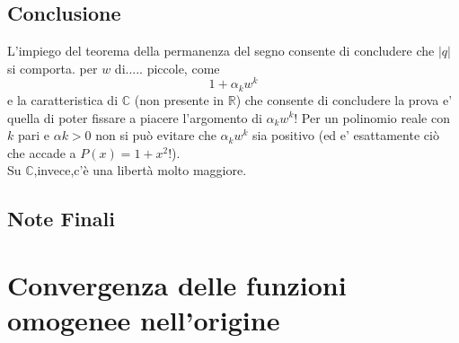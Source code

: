 \documentclass[fontsize = 20px, paper = a4]{article}
\begin{document}
\subsection{Conclusione}
L'impiego del teorema della permanenza del segno consente di concludere che $|q|$ si comporta. per $w$ di..... piccole, come 
$$1 + \alpha_{k}w^k$$
e la caratteristica di $\mathbb{C}$ (non presente in $\mathbb{R}$) che consente di concludere la prova e' quella di poter fissare a piacere l'argomento di $\alpha_{k}w^k$! Per un polinomio reale con $k$ pari e $\alpha{k} > 0$ non si può evitare che $\alpha_{k}w^k$ sia positivo (ed e' esattamente ciò che accade a $P(x)= 1 + x^{2}$!).\\
Su $\mathbb{C}$,invece,c'è una libertà molto maggiore.
\subsection{Note Finali}
\section{Convergenza delle funzioni omogenee nell'origine}
\end{document}
